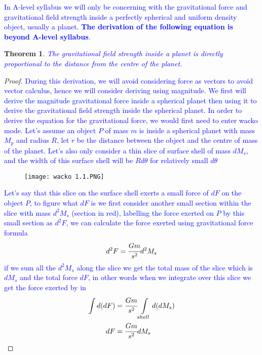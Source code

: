 \documentclass{article}
\newtheorem{theorem}{Theorem}[subsection]
\begin{document}
\textcolor{blue}{In A-level syllabus we will only be concerning with the gravitational force and gravitational field strength inside a perfectly spherical and uniform density object, usually a planet. \textbf{The derivation of the following equation is beyond A-level syllabus}.}

\begin{theorem}
\textcolor{blue}{The gravitational field strength inside a planet is directly proportional to the distance from the centre of the planet.}
\end{theorem}

\begin{proof}


\textcolor{blue}{During this derivation, we will avoid considering force as vectors to avoid vector calculus, hence we will consider deriving using magnitude. We first will derive the magnitude gravitational force inside a spherical planet then using it to derive the gravitational field strength inside the spherical planet. In order to derive the equation for the gravitational force, we would first need to enter wacko mode. Let's assume an object $P$ of mass $m$ is inside a spherical planet with mass $M_p$ and radius $R$, let $r$ be the distance between the object and the centre of mass of the planet. Let's also only consider a thin slice of surface shell of mass $dM_s$, and the width of this surface shell will be $R d\theta$ for relatively small $d\theta$}

\begin{figure}[H]
    \centering
    \texttt{[image: wacko 1.1.PNG]}
\end{figure}

\textcolor{blue}{Let's say that this slice on the surface shell exerts a small force of $dF$ on the object $P$, to figure what $dF$ is we first consider another small section within the slice with mass $d^2M_s$ (section in red), labelling the force exerted on $P$ by this small section as $d^2F$, we can calculate the force exerted using gravitational force formula 
$$d^2F=\cfrac{Gm}{s^2}d^2M_s$$
if we sum all the $d^2M_s$ along the slice we get the total mass of the slice which is $dM_s$ and the total force $dF$, in other words when we integrate over this slice we get the force exerted by in 
\begin{align*}
    \int d(dF)&=\cfrac{Gm}{s^2}\int \limits_{shell}d(dM_s) \\
    dF&=\cfrac{Gm}{s^2}dM_s
\end{align*}}


\end{proof}
\end{document}
